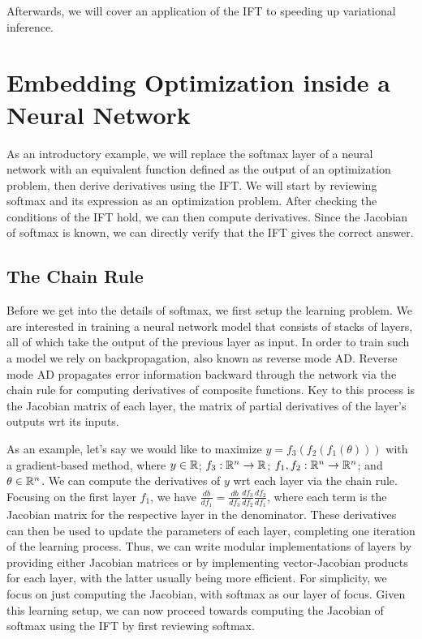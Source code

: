 \documentclass[11pt]{article}
\begin{document}
Afterwards, we will cover an application of the IFT to speeding up variational inference.

\section{Embedding Optimization inside a Neural Network}
As an introductory example,
we will replace the softmax layer of a neural network with an equivalent function
defined as the output of an optimization problem, then derive derivatives using the IFT.
We will start by reviewing softmax and its expression as an optimization problem.
After checking the conditions of the IFT hold, we can then compute derivatives.
Since the Jacobian of softmax is known, we can directly verify that the IFT gives
the correct answer.

\subsection{The Chain Rule}
Before we get into the details of softmax, we first setup the learning problem.
We are interested in training a neural network model that consists of stacks of layers,
all of which take the output of the previous layer as input.
In order to train such a model we rely on backpropagation,  also known as reverse mode AD.
Reverse mode AD propagates error information backward through the network via the chain rule
for computing derivatives of composite functions.
Key to this process is the Jacobian matrix of each layer, the matrix of partial derivatives
of the layer's outputs wrt its inputs.

As an example, let's say we would like to maximize $y = f_3(f_2(f_1(\theta)))$ with a gradient-based method,
where $y\in\mathbb{R}$; $f_3:\mathbb{R}^n\to\mathbb{R}$; $f_1,f_2:\mathbb{R}^n\to\mathbb{R}^n$; and $\theta\in\mathbb{R}^n$.
We can compute the derivatives of $y$ wrt each layer via the chain rule.
Focusing on the first layer $f_1$,
we have $\frac{db}{df_1} = \frac{db}{df_3}\frac{df_3}{df_2}\frac{df_2}{df_1}$,
where each term is the Jacobian matrix for the respective layer in the denominator.
These derivatives can then be used to update the parameters of each layer,
completing one iteration of the learning process.
Thus, we can write modular implementations of layers by providing either Jacobian matrices
or by implementing vector-Jacobian products for each layer, with the latter usually
being more efficient.
For simplicity, we focus on just computing the Jacobian, with softmax as our
layer of focus.
Given this learning setup, we can now proceed towards computing the Jacobian of softmax
using the IFT by first reviewing softmax.
\end{document}
